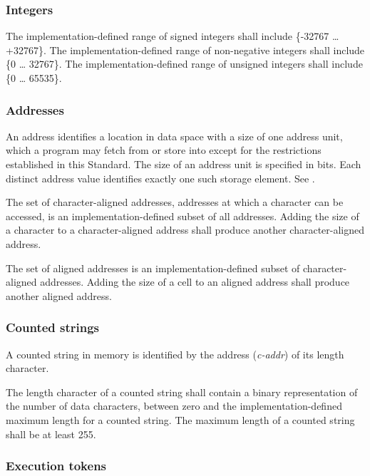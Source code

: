 \subsubsection{Integers} %

The implementation-defined range of signed integers shall include
\{-32767 {\ldots} +32767\}. The im\-ple\-ment\-ation-de\-fined range of
non-negative integers shall include \{0 {\ldots} 32767\}. The
implementation-defined range of unsigned integers shall include
\{0 {\ldots} 65535\}.

\subsubsection{Addresses} %
\label{usage:addr}

An address identifies a location in data space with a size of one
address unit, which a program may fetch from or store into except
for the restrictions established in this Standard. The size of an
address unit is specified in bits. Each distinct address value
identifies exactly one such storage element.
See .

The set of character-aligned addresses, addresses at which a
character can be accessed, is an im\-ple\-ment\-ation-de\-fined subset of
all addresses. Adding the size of a character to a character-aligned
address shall produce another character-aligned address.

The set of aligned addresses is an implementation-defined subset
of character-aligned addresses. Adding the size of a cell to an
aligned address shall produce another aligned address.

\subsubsection{Counted strings} %
\label{usage:cstring}

A counted string in memory is identified by the address
(\emph{c-addr}) of its length character.

The length character of a counted string shall contain a binary
representation of the number of data characters, between zero and
the implementation-defined maximum length for a counted string.
The maximum length of a counted string shall be at least 255.

\subsubsection{Execution tokens} %

